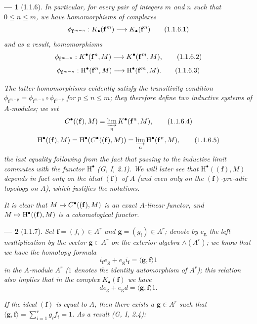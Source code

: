 \documentclass[oneside]{amsart}
\theoremstyle{ega-env-style}
\newtheorem*{env}{---}
\theoremstyle{ega-thm-env-style}
\theoremstyle{ega-defn-env-style}
\def\leq{\leqslant}                 %
\def\vphi{\phi}                     %
\def\HH{\mathrm{H}}                 %
\renewcommand{\to}{\mathchoice{\longrightarrow}{\rightarrow}{\rightarrow}{\rightarrow}}
\let\mapstoo\mapsto
\renewcommand{\mapsto}{\mathchoice{\longmapsto}{\mapstoo}{\mapstoo}{\mapstoo}}
\newcommand{\oldpage}[2][]{{\marginnote{\normalfont{\textbf{#1}~|~#2}}}\ignorespaces}
\let\EGAOriginalLabel\label
\renewcommand{\label}[1]{\phantomsection\EGAOriginalLabel{#1}}
\begin{document}
\begin{env}[1.1.6]
\label{III.1.1.6}
In particular, for every pair of integers $m$ and $n$ such that $0\leq n\leq m$, we have homomorphisms of complexes
\[
  \vphi_{\mathbf{f}^{m-n}}:K_\bullet(\mathbf{f}^m)\to K_\bullet(\mathbf{f}^n)
  \tag{1.1.6.1}
\]
and as a result, homomorphisms
\[
  \vphi_{\mathbf{f}^{m-n}}:K^\bullet(\mathbf{f}^n,M)\to K^\bullet(\mathbf{f}^m,M),
  \tag{1.1.6.2}
\]
\[
  \vphi_{\mathbf{f}^{m-n}}:\HH^\bullet(\mathbf{f}^n,M)\to\HH^\bullet(\mathbf{f}^m,M).
  \tag{1.1.6.3}
\]

\oldpage[III]{85}
The latter homomorphisms evidently satisfy the transitivity condition $\vphi_{\mathbf{f}^{m-p}}=\vphi_{\mathbf{f}^{m-n}}\circ\vphi_{\mathbf{f}^{n-p}}$ for $p\leq n\leq m$; they therefore define two \emph{inductive systems} of $A$-modules; we set
\[
  C^\bullet((\mathbf{f}),M)=\varinjlim_n K^\bullet(\mathbf{f}^n,M),
  \tag{1.1.6.4}
\]
\[
  \HH^\bullet((\mathbf{f}),M)=\HH^\bullet(C^\bullet((\mathbf{f}),M))=\varinjlim_n\HH^\bullet(\mathbf{f}^n,M),
  \tag{1.1.6.5}
\]
the last equality following from the fact that passing to the inductive limit commutes with the functor $\HH^\bullet$ (G, I, 2.1).
We will later see  that $\HH^\bullet((\mathbf{f}),M)$ depends in fact only on the \emph{ideal $(\mathbf{f})$} of $A$ (and even only on the $(\mathbf{f})$-pre-adic topology on $A$), which justifies the notations.

It is clear that $M\mapsto C^\bullet((\mathbf{f}),M)$ is an exact $A$-linear functor, and $M\mapsto\HH^\bullet((\mathbf{f}),M)$ is a cohomological functor.
\end{env}

\begin{env}[1.1.7]
\label{III.1.1.7}
Set $\mathbf{f}=(f_i)\in A^r$ and $\mathbf{g}=(g_i)\in A^r$; denote by $e_\mathbf{g}$ the left multiplication by the vector $\mathbf{g}\in A^r$ on the exterior algebra $\wedge(A^r)$; we know that we have the \emph{homotopy formula}
\[
  i_\mathbf{f}e_\mathbf{g}+e_\mathbf{g}i_\mathbf{f}=\langle\mathbf{g},\mathbf{f}\rangle 1
  \tag{1.1.7.1}
\]
in the $A$-module $A^r$ ($1$ denotes the identity automorphism of $A^r$); this relation also implies that \emph{in the complex $K_\bullet(\mathbf{f})$} we have
\[
  de_\mathbf{g}+e_\mathbf{g}d=\langle\mathbf{g},\mathbf{f}\rangle 1.
  \tag{1.1.7.2}
\]

If the ideal $(\mathbf{f})$ is equal to $A$, then there exists a $\mathbf{g}\in A^r$ such that $\langle\mathbf{g},\mathbf{f}\rangle=\sum_{i=1}^r g_i f_i=1$.
As a result (G, I, 2.4):
\end{env}
\end{document}
